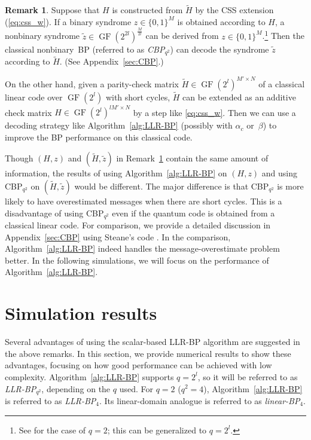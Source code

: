 \documentclass{ieeeaccess}
\DeclareMathOperator{\GF}{GF}
\let\emph\textit
\theoremstyle{definition}		%
\newtheorem{remark}{Remark}
\begin{document}
 \begin{remark} \label{rmk:add_vs_lin}
 	Suppose that  $H$ is constructed from $\tilde H$ by the  CSS extension (\ref{eq:css_w}).
 	If a binary syndrome $z\in\{0,1\}^M$ is obtained according to $H$,
 	a nonbinary syndrome $\tilde z\in\GF(2^{2l})^{\frac{M}{2l}}$ can be derived from $z\in\{0,1\}^M$.\footnote{
 		See \cite[Table~5]{Bab+15} for the case of $q=2$; this can be generalized to  $q=2^l$. %
 		}
 	Then the classical nonbinary~BP (referred to as \emph{CBP$_{q^2}$}) can decode the syndrome $\tilde z$ according to $\tilde H$. (See Appendix~\ref{sec:CBP}.)
	
	On the other hand, given a parity-check matrix $\tilde H\in \GF(2^l)^{M'\times N}$ of a classical linear code over $\GF(2^l)$ with short cycles, 
	$\tilde H$ can be extended as an additive check matrix $H\in \GF(2^l)^{lM'\times N}$ by a step like \eqref{eq:css_w}. 
	Then we can use a decoding strategy like Algorithm~\ref{alg:LLR-BP} (possibly with $\alpha_c$ or~$\beta$) to improve the BP performance on this classical code.
\end{remark}
 
 	Though $(H,z)$ and $(\tilde H, \tilde z)$ in Remark~\ref{rmk:add_vs_lin} contain the same amount of information,
 	the results of using Algorithm~\ref{alg:LLR-BP} on $(H,z)$ and using CBP$_{q^2}$ on $(\tilde H, \tilde z)$ would be different.
 	The major difference is that CBP$_{q^2}$ is more likely to have overestimated messages when there are short cycles.
 	This is a disadvantage of using CBP$_{q^2}$ even if the quantum code is obtained from a classical linear code.
 	For comparison, we provide a detailed discussion in Appendix~\ref{sec:CBP}  using Steane's code \cite{Steane96}.
 	In the comparison, Algorithm~\ref{alg:LLR-BP} indeed handles the  message-overestimate problem better.
	In the following simulations, we will focus on the performance of Algorithm~\ref{alg:LLR-BP}.







\section{Simulation results} \label{sec:sim}


Several advantages of using the  scalar-based LLR-BP algorithm are suggested in the above remarks.
In this section, we provide numerical results to show these advantages, focusing on how good performance can be achieved with low complexity.
%
{Algorithm~\ref{alg:LLR-BP} supports $q=2^l$, so it will be referred to as \mbox{\emph{LLR-BP$_{q^2}$}}, depending on the $q$ used.}
For $q=2$ \mbox{($q^2=4$)}, Algorithm~\ref{alg:LLR-BP} is referred to as \mbox{\emph{LLR-BP$_4$}}. 
Its linear-domain analogue \cite[Algorithm~3]{KL20} is referred to as \mbox{\emph{linear-BP$_4$}}.
\end{document}
